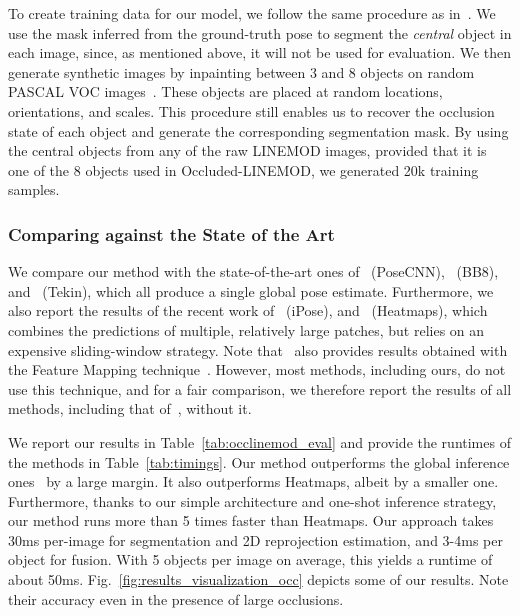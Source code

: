 \documentclass[10pt,twocolumn,letterpaper]{article}
\begin{document}
To create training data for our model, we follow the same procedure as in~\cite{Li18a,Tekin18a}. We use the mask inferred from the ground-truth pose to segment the {\it central} object in each image, since, as mentioned above, it will not be used for evaluation. We then generate synthetic images by inpainting between 3 and 8 objects on random PASCAL VOC images~\cite{Everingham10}. These objects are placed at random locations, orientations, and scales. This procedure still enables us to recover the occlusion state of each object and generate the corresponding segmentation mask. By using the central objects from any of the raw LINEMOD images, provided that it is one of the 8 objects used in Occluded-LINEMOD, we generated 20k training samples. 



\subsubsection{Comparing against the State of the Art}
We compare our method with the state-of-the-art ones of~\cite{Xiang18b} (PoseCNN),~\cite{Rad17} (BB8), and~\cite{Tekin18a} (Tekin), which all produce a single global pose estimate. Furthermore, we also report the results of the recent work of~\cite{Jafari18} (iPose), and~\cite{Oberweger18} (Heatmaps), which combines the predictions of multiple, relatively large patches,  but relies on an expensive sliding-window strategy. Note that~\cite{Oberweger18} also provides results obtained with the Feature Mapping technique~\cite{Rad18}. However, most methods, including ours, do not use this technique, and for a fair comparison, we therefore report the results of all methods, including that of~\cite{Oberweger18}, without it.



We report our results in Table~\ref{tab:occlinemod_eval} and provide the runtimes of the methods in Table~\ref{tab:timings}. Our method outperforms the global inference ones~\cite{Xiang18b,Rad17,Tekin18a} by a large margin. It also outperforms Heatmaps, albeit by a smaller one. Furthermore, thanks to our simple architecture and one-shot inference strategy, our method runs more than 5 times faster than Heatmaps. Our approach takes 30ms per-image for segmentation and 2D reprojection estimation, and 3-4ms per object for fusion. With 5 objects per image on average, this yields a runtime of about 50ms. Fig.~\ref{fig:results_visualization_occ} depicts some of our results. Note their accuracy even in the presence of large occlusions. 
\end{document}
